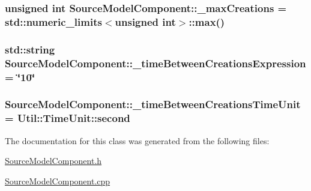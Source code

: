 \subsubsection[{\texorpdfstring{\+\_\+max\+Creations}{_maxCreations}}]{\setlength{\rightskip}{0pt plus 5cm}unsigned int Source\+Model\+Component\+::\+\_\+max\+Creations = std\+::numeric\+\_\+limits$<$unsigned int$>$\+::max()\hspace{0.3cm}{\ttfamily [protected]}}\hypertarget{class_source_model_component_a99525d31bdc32efd5bbdcfbbbf115ec5}{}\label{class_source_model_component_a99525d31bdc32efd5bbdcfbbbf115ec5}
\subsubsection[{\texorpdfstring{\+\_\+time\+Between\+Creations\+Expression}{_timeBetweenCreationsExpression}}]{\setlength{\rightskip}{0pt plus 5cm}std\+::string Source\+Model\+Component\+::\+\_\+time\+Between\+Creations\+Expression = \char`\"{}10\char`\"{}\hspace{0.3cm}{\ttfamily [protected]}}\hypertarget{class_source_model_component_ab0c96af4d61d8125773fa41cff865211}{}\label{class_source_model_component_ab0c96af4d61d8125773fa41cff865211}
\subsubsection[{\texorpdfstring{\+\_\+time\+Between\+Creations\+Time\+Unit}{_timeBetweenCreationsTimeUnit}}]{ Source\+Model\+Component\+::\+\_\+time\+Between\+Creations\+Time\+Unit = {\bf Util\+::\+Time\+Unit\+::second}\hspace{0.3cm}{\ttfamily [protected]}}\hypertarget{class_source_model_component_af34df20551bc223eb103ca87e9f1463e}{}\label{class_source_model_component_af34df20551bc223eb103ca87e9f1463e}


The documentation for this class was generated from the following files\+:\begin{DoxyCompactItemize}
\item 
\hyperlink{_source_model_component_8h}{Source\+Model\+Component.\+h}\item 
\hyperlink{_source_model_component_8cpp}{Source\+Model\+Component.\+cpp}\end{DoxyCompactItemize}
